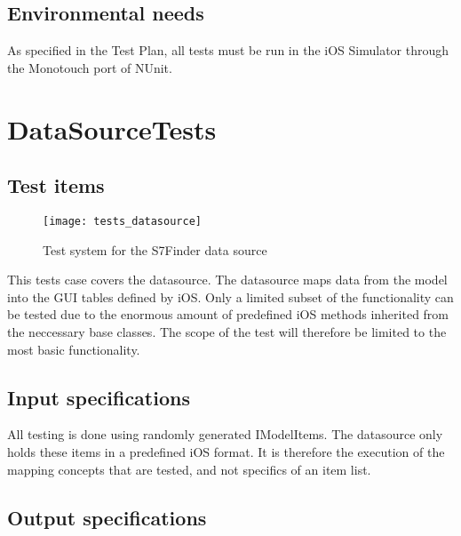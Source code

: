 \subsection{Environmental needs} %
\label{sec:Environmental_needs}

As specified in the Test Plan, all tests must be run in the iOS Simulator through the
Monotouch port of NUnit.



\clearpage

\section{DataSourceTests} %
\label{prt:DataSourceTests}

\subsection{Test items} %
\label{sec:Test_items}

\begin{figure}[h!]
    \centerline{\texttt{[image: tests\_datasource]}}
    \caption{Test system for the S7Finder data source}
    \label{fig:test_system}
\end{figure}

This tests case covers the datasource. The datasource maps data from
the model into the GUI tables defined by iOS. Only a limited subset of
the functionality can be tested due to the enormous amount of predefined
iOS methods inherited from the neccessary base classes. The scope of the
test will therefore be limited to the most basic functionality.


\subsection{Input specifications} %
\label{sec:Input_specifications}

All testing is done using randomly generated IModelItems. The datasource only
holds these items in a predefined iOS format. It is therefore the execution of
the mapping concepts that are tested, and not specifics of an item list.


\subsection{Output specifications} %
\label{sec:Output_specifications}

